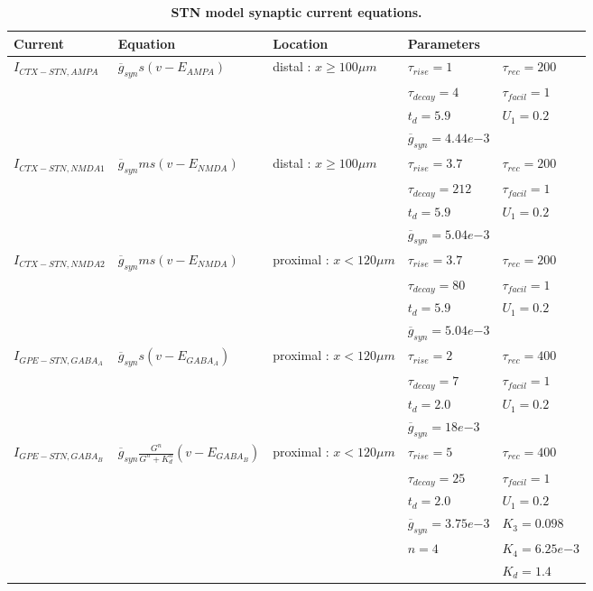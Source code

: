 %
%
%

%

\begin{table}[ht]
\centering
\caption{{\bf STN model synaptic current equations.}}
\begin{adjustbox}{width=\textwidth}
\begin{tabular}{lllll}
\toprule
Current & Equation & Location & Parameters &  \\ \midrule
$ I_{CTX−STN,AMPA} $ & $ \overline{g}_{syn} s (v - E_{AMPA}) $ & distal : $ x \geq 100 \mu m $ & $ \tau_{rise} = 1 $ & $ \tau_{rec} = 200 $ \\
 &  &  & $ \tau_{decay} = 4 $ & $ \tau_{facil} = 1 $ \\
 &  &  & $ t_{d} = 5.9 $ & $ U_1 = 0.2 $ \\
 &  &  & $ \overline{g}_{syn} = 4.44 e{-3} $ &  \\ \midrule
$ I_{CTX−STN,NMDA1} $ & $ \overline{g}_{syn} m s (v - E_{NMDA}) $ & distal : $ x \geq 100 \mu m $ & $ \tau_{rise} = 3.7 $ & $ \tau_{rec} = 200 $ \\
 &  &  & $ \tau_{decay} = 212 $ & $ \tau_{facil} = 1 $ \\
 &  &  & $ t_{d} = 5.9 $ & $ U_1 = 0.2 $ \\
 &  &  & $ \overline{g}_{syn} = 5.04 e{-3} $ &  \\ \midrule
$ I_{CTX−STN,NMDA2} $ & $ \overline{g}_{syn} m s (v - E_{NMDA}) $ & proximal : $ x < 120 \mu m $ & $ \tau_{rise} = 3.7 $ & $ \tau_{rec} = 200 $ \\
 &  &  & $ \tau_{decay} = 80 $ & $ \tau_{facil} = 1 $ \\
 &  &  & $ t_{d} = 5.9 $ & $ U_1 = 0.2 $ \\
 &  &  & $ \overline{g}_{syn} = 5.04 e{-3} $ &  \\ \midrule
$ I_{GPE−STN,GABA_A} $ & $ \overline{g}_{syn} s (v - E_{GABA_A}) $ & proximal : $ x < 120 \mu m $ & $ \tau_{rise} = 2 $ & $ \tau_{rec} = 400 $ \\
 &  &  & $ \tau_{decay} = 7 $ & $ \tau_{facil} = 1 $ \\
 &  &  & $ t_{d} = 2.0 $ & $ U_1 = 0.2 $ \\
 &  &  & $ \overline{g}_{syn} = 18 e{-3} $ &  \\ \midrule
$ I_{GPE−STN,GABA_B} $ & $ \overline{g}_{syn} \tfrac{G^n}{G^n + K_d^n} (v - E_{GABA_B}) $ & proximal : $ x < 120 \mu m $ & $ \tau_{rise} = 5 $ & $ \tau_{rec} = 400 $ \\
 &  &  & $ \tau_{decay} = 25 $ & $ \tau_{facil} = 1 $ \\
 &  &  & $ t_{d} = 2.0 $ & $ U_1 = 0.2 $ \\
 &  &  & $ \overline{g}_{syn} = 3.75 e{-3} $ & $ K_3 = 0.098 $ \\
 &  &  & $ n = 4 $ & $ K_4 = 6.25 e{-3} $ \\
 &  &  &  & $ K_d = 1.4 $ \\ \bottomrule
\end{tabular}
\end{adjustbox}
%
%
\label{tab:stn_synaptic_currents}
\end{table}

